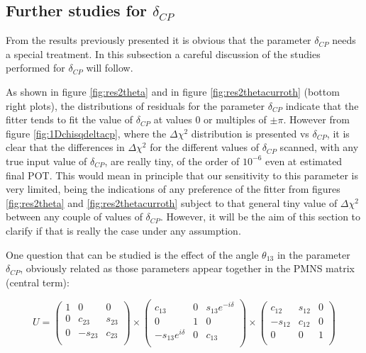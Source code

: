 \subsection{Further studies for $\delta_{CP}$}
\label{subsec:deltaCP}

From the results previously presented it is obvious that the parameter $\delta_{CP}$ needs a special treatment. In this subsection a careful discussion of the studies performed for $\delta_{CP}$ will follow.

As shown in figure \ref{fig:res2theta}  and in figure \ref{fig:res2thetacurroth} (bottom right plots), the distributions of residuals for the parameter $\delta_{CP}$ indicate that the fitter tends to fit the value of $\delta_{CP}$ at values 0 or multiples of $\pm \pi$. However from figure \ref{fig:1Dchisqdeltacp}, where the $\Delta\chi^{2}$ distribution is presented vs $\delta_{CP}$, it is clear that the differences in $\Delta\chi^{2}$ for the different values of $\delta_{CP}$ scanned, with any true input value of $\delta_{CP}$, are really tiny, of the order of $10^{-6}$ even at estimated final POT. This would mean in principle that our sensitivity to this parameter is very limited, being the indications of any preference of the fitter from figures \ref{fig:res2theta} and \ref{fig:res2thetacurroth} subject to that general tiny value of $\Delta\chi^{2}$ between any couple of values of $\delta_{CP}$. However, it will be the aim of this section to clarify if that is really the case under any assumption. 

One question that can be studied is the effect of the angle $\theta_{13}$ in the parameter $\delta_{CP}$, obviously related as those parameters appear together in the PMNS matrix (central term):

\begin{equation}
U = \left( \begin{array}{ccc} 1 & 0 & 0 \\  0 & c_{23} & s_{23} \\ 0 & -s_{23} & c_{23}\\ \end{array} \right) \times \left( \begin{array}{ccc}  c_{13} & 0 & s_{13}e^{-i\delta} \\ 0 & 1 & 0 \\ - s_{13}e^{i\delta} & 0 & c_{13}\\ \end{array} \right) \times \left( \begin{array}{ccc}  c_{12} & s_{12} & 0 \\ -s_{12} & c_{12} & 0 \\ 0 & 0 & 1\\ \end{array} \right)
\label{eq:PMNS}
\end{equation}

